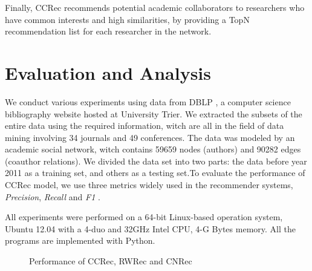 \documentclass{acm_proc_article-sp}
\begin{document}
Finally, CCRec recommends potential academic collaborators to researchers who have common interests and high similarities, by providing a TopN recommendation list for each researcher in the network.

\section{Evaluation and Analysis}
We conduct various experiments using data from DBLP \cite{Ley:DBLP}, a computer science bibliography website hosted at University Trier. We extracted the subsets of the entire data using the required information, witch are all in the field of data mining involving 34 journals and 49 conferences. The data was modeled by an academic social network, witch contains 59659 nodes (authors) and 90282 edges (coauthor relations). We divided the data set into two parts: the data before year 2011 as a training set, and others as a testing set.To evaluate the performance of CCRec model, we use three metrics widely used in the recommender systems, \emph{Precision}, \emph{Recall} and \emph{F1} \cite{shani2011evaluating}.

All experiments were performed on a 64-bit Linux-based operation system, Ubuntu 12.04 with a 4-duo and 32GHz Intel CPU, 4-G Bytes memory. All the programs are implemented with Python.

\begin{figure}
\centering
{}
\caption{Performance of CCRec, RWRec and CNRec}
\label{fig:5}       %
\end{figure}
\end{document}
